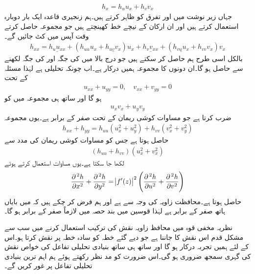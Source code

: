 \begin{align*}
h_x=h_uu_x+h_vv_x
\end{align*}
جہاں زیر نوشت میں  اور  تفرق کو ظاہر کرتے ہیں۔ہم زنجیری قاعدہ ایک بار دوبارہ استعمال کرتے ہیں اور ان ارکان کے نیچے خط کھینچتے ہیں جو  مجموعہ حاصل کرتے وقت آپس میں کٹ جائیں گے۔
\begin{align*}
h_{xx}=\underline{h_uu_{xx}}+(h_{uu}u_x+\underline{h_{uv}v_x})u_x+\underline{h_vv_{xx}}+(\underline{h_{vu}u_x}+h_{vv}v_x)v_x
\end{align*}
بالکل اسی طرح ہم  حاصل کر سکتے ہیں جو درج بالا میں  کی جگہ  اور  کی جگہ  لکھنے سے حاصل ہو گا۔ان دونوں کا مجموعہ  ہمیں درکار ہے۔اب چونکہ  تحلیلی ہے لہٰذا مسئلہ  کے تحت 
\begin{align*}
u_{xx}+u_{yy}=0,\quad v_{xx}+v_{yy}=0
\end{align*}
ہو گا اور ساتھ ہی مجموعہ میں  کو 
\begin{align*}
u_xv_x+u_yv_y
\end{align*}
ضرب کرتا ہے جو مساوات کوشی ریمان کے تحت صفر کے برابر ہے۔یوں مجموعہ
\begin{align*}
h_{xx}+h_{yy}=h_{uu}(u_x^2+u_y^2)+h_{vv}(v_x^2+v_y^2)
\end{align*}
حاصل ہوتا ہے جس کو مساوات کوشی ریمان کی مدد سے
\begin{align*}
(h_{uu}+h_{vv})(u_x^2+v_x^2)
\end{align*}
لکھا جا سکتا ہے۔یوں مساوات  استعمال کرتے ہوئے
\begin{align}
\frac{\partial^{\,2}h}{\partial x^2}+\frac{\partial^{\,2}h}{\partial y^2}=\abs{f'(z)}^2\left(\frac{\partial^{\,2}h}{\partial u^2}+\frac{\partial^{\,2}h}{\partial v^2}\right)
\end{align}
حاصل ہوتا ہے۔محافظت زاویہ کی وجہ سے  ہے اور ہم فرض کر چکے ہیں کہ  میں بایاں ہاتھ صفر کے برابر ہے لہٰذا قوسین میں بند حصہ  میں لازماً صفر کے برابر ہو گا۔  

نظریہ مخفی قوہ میں محافظ زاویہ نقش کی ترکیب استعمال کرنے میں سب سے مشکل قدم اس نقش کا جاننا ہے  جو دیے گئے خطہ کو سادہ خطہ پر نقش کرتا ہو۔اس کے لئے ہمیں تجربہ درکار ہو گا اور ساتھ ہی ساتھ بنیادی تحلیلی تفاعل کی خواص نقش کی گہری  سمجھ ضروری ہو گی۔اس ضرورت کو مد نظر رکھتے ہوئے ہم اہم ترین بنیادی تحلیلی تفاعل پر غور کریں گے۔


